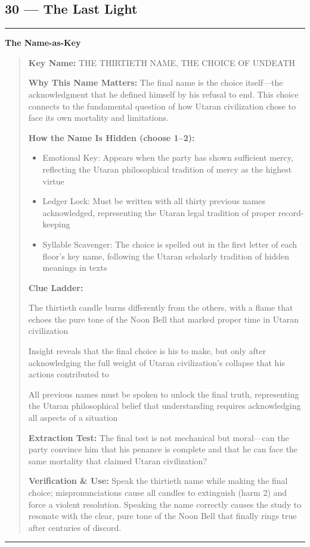 \documentclass[18pt, letterpaper, twoside]{article}
\newenvironment{floorbox}[1]{%
    \begin{center}
    \begin{minipage}{0.95\textwidth}
    \subsection*{#1}
    \vspace{-0.5em}
    \rule{\textwidth}{0.5pt}
    \vspace{0.5em}
}{%
    \vspace{0.5em}
    \rule{\textwidth}{0.5pt}
    \end{minipage}
    \end{center}
}
\newenvironment{gmnote}[1]{%
    \vspace{0.5em}
    \noindent\textbf{#1}
    \begin{quote}
}{%
    \end{quote}
    \vspace{0.5em}
}
\newcommand{\keyname}[1]{\noindent\textbf{Key Name:} #1\par}
\newcommand{\nameimportance}[1]{\noindent\textbf{Why This Name Matters:} #1\par}
\begin{document}
\begin{floorbox}{30 --- The Last Light}
\begin{gmnote}{The Name-as-Key}
\keyname{THE THIRTIETH NAME, THE CHOICE OF UNDEATH}
\nameimportance{The final name is the choice itself---the acknowledgment that he defined himself by his refusal to end. This choice connects to the fundamental question of how Utaran civilization chose to face its own mortality and limitations.}

\textbf{How the Name Is Hidden (choose 1--2):}
\begin{itemize}[leftmargin=*]
    \item Emotional Key: Appears when the party has shown sufficient mercy, reflecting the Utaran philosophical tradition of mercy as the highest virtue
    \item Ledger Lock: Must be written with all thirty previous names acknowledged, representing the Utaran legal tradition of proper record-keeping
    \item Syllable Scavenger: The choice is spelled out in the first letter of each floor's key name, following the Utaran scholarly tradition of hidden meanings in texts
\end{itemize}

\textbf{Clue Ladder:}
\begin{description}[leftmargin=*, style=unboxed]
    \item[Gentle Nudge:] The thirtieth candle burns differently from the others, with a flame that echoes the pure tone of the Noon Bell that marked proper time in Utaran civilization
    \item[Actionable Lead:] Insight reveals that the final choice is his to make, but only after acknowledging the full weight of Utaran civilization's collapse that his actions contributed to
    \item[Aha! Proof:] All previous names must be spoken to unlock the final truth, representing the Utaran philosophical belief that understanding requires acknowledging all aspects of a situation
\end{description}

\textbf{Extraction Test:} The final test is not mechanical but moral---can the party convince him that his penance is complete and that he can face the same mortality that claimed Utaran civilization?

\textbf{Verification \& Use:} Speak the thirtieth name while making the final choice; mispronunciations cause all candles to extinguish (harm 2) and force a violent resolution. Speaking the name correctly causes the study to resonate with the clear, pure tone of the Noon Bell that finally rings true after centuries of discord.
\end{gmnote}


\end{floorbox}
\end{document}
